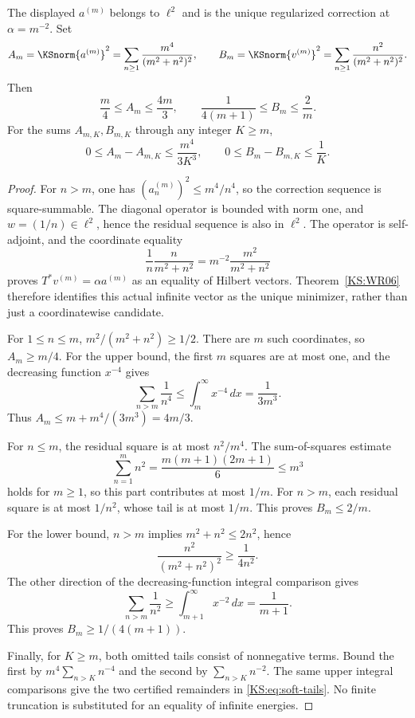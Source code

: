 \begin{KSproposition}\label{KS:WR10}
The displayed $a^{(m)}$ belongs to $\ell^2$ and is the unique regularized correction at $\alpha=m^{-2}$. Set
\[
 A_m=\KSnorm{a^{(m)}}^2=\sum_{n\ge1}\frac{m^4}{(m^2+n^2)^2},\qquad
 B_m=\KSnorm{v^{(m)}}^2=\sum_{n\ge1}\frac{n^2}{(m^2+n^2)^2}.
\]
Then
\begin{equation}\label{KS:eq:soft-bounds}
 \frac m4\le A_m\le\frac{4m}{3},\qquad
 \frac1{4(m+1)}\le B_m\le\frac2m.
\end{equation}
For the sums $A_{m,K},B_{m,K}$ through any integer $K\ge m$,
\begin{equation}\label{KS:eq:soft-tails}
 0\le A_m-A_{m,K}\le\frac{m^4}{3K^3},\qquad
 0\le B_m-B_{m,K}\le\frac1K.
\end{equation}
\end{KSproposition}
\begin{proof}
For $n>m$, one has $(a_n^{(m)})^2\le m^4/n^4$, so the correction sequence is square-summable. The diagonal operator is bounded with norm one, and $w=(1/n)\in\ell^2$, hence the residual sequence is also in $\ell^2$. The operator is self-adjoint, and the coordinate equality
\[
 \frac1n\frac{n}{m^2+n^2}
 =m^{-2}\frac{m^2}{m^2+n^2}
\]
proves $T^*v^{(m)}=\alpha a^{(m)}$ as an equality of Hilbert vectors. Theorem~\ref{KS:WR06} therefore identifies this actual infinite vector as the unique minimizer, rather than just a coordinatewise candidate.

For $1\le n\le m$, $m^2/(m^2+n^2)\ge1/2$. There are $m$ such coordinates, so $A_m\ge m/4$. For the upper bound, the first $m$ squares are at most one, and the decreasing function $x^{-4}$ gives
\[
 \sum_{n>m}\frac1{n^4}\le\int_m^\infty x^{-4}\,dx=\frac1{3m^3}.
\]
Thus $A_m\le m+m^4/(3m^3)=4m/3$.

For $n\le m$, the residual square is at most $n^2/m^4$. The sum-of-squares estimate
\[
 \sum_{n=1}^m n^2=\frac{m(m+1)(2m+1)}6\le m^3
\]
holds for $m\ge1$, so this part contributes at most $1/m$. For $n>m$, each residual square is at most $1/n^2$, whose tail is at most $1/m$. This proves $B_m\le2/m$.

For the lower bound, $n>m$ implies $m^2+n^2\le2n^2$, hence
\[
 \frac{n^2}{(m^2+n^2)^2}\ge\frac1{4n^2}.
\]
The other direction of the decreasing-function integral comparison gives
\[
 \sum_{n>m}\frac1{n^2}\ge\int_{m+1}^\infty x^{-2}\,dx=\frac1{m+1}.
\]
This proves $B_m\ge1/(4(m+1))$.

Finally, for $K\ge m$, both omitted tails consist of nonnegative terms. Bound the first by $m^4\sum_{n>K}n^{-4}$ and the second by $\sum_{n>K}n^{-2}$. The same upper integral comparisons give the two certified remainders in \eqref{KS:eq:soft-tails}. No finite truncation is substituted for an equality of infinite energies.
\end{proof}


